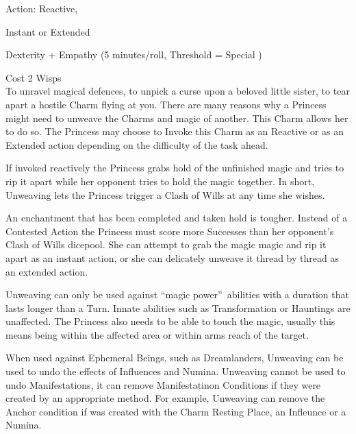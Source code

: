 \noindent Action: Reactive,

\noindent Instant or Extended

\noindent Dexterity + Empathy (5 minutes/roll, Threshold = Special )

\noindent Cost 2 Wisps\\

To unravel magical defences, to unpick a curse upon a beloved little sister, to tear apart a hostile Charm flying at you. There are many reasons why a Princess might need to unweave the Charms and magic of another. This Charm allows her to do so. The Princess may choose to Invoke this Charm as an Reactive or as an Extended action depending on the difficulty of the task ahead. 

If invoked reactively the Princess grabs hold of the unfinished magic and tries to rip it apart while her opponent tries to hold the magic together. In short, Unweaving lets the Princess trigger a Clash of Wills at any time she wishes.

An enchantment that has been completed and taken hold is tougher. Instead of a Contested Action the Princess must score more Successes than her opponent's Clash of Wills dicepool. She can attempt to grab the magic magic and rip it apart as an instant action, or she can delicately unweave it thread by thread as an extended action. 

Unweaving can only be used against \textquotedblleft magic power\textquotedblright\, abilities with a duration that lasts longer than a Turn. Innate abilities such as Transformation or Hauntings are unaffected. The Princess also needs to be able to touch the magic, usually this means being within the affected area or within arms reach of the target. 

When used against Ephemeral Beings, such as Dreamlanders, Unweaving can be used to undo the effects of Influences and Numina. Unweaving cannot be used to undo Manifestations, it can remove Manifestatinon Conditions if they were created by an appropriate method. For example, Unweaving can remove the Anchor condition if was created with the Charm Resting Place, an Infleunce or a Numina. 

